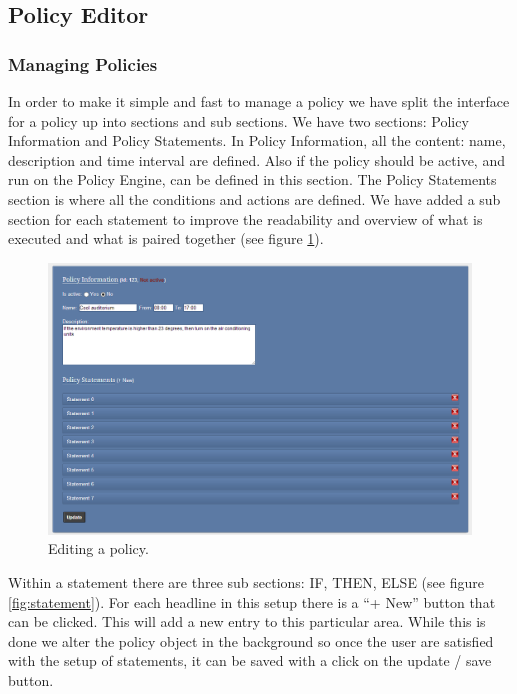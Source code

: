 \subsection{Policy Editor}

\subsubsection{Managing Policies}
In order to make it simple and fast to manage a policy we have split the interface for a policy up into sections and sub sections. We have two sections: Policy Information and Policy Statements. In Policy Information, all the content: name, description and time interval are defined. Also if the policy should be active, and run on the Policy Engine, can be defined in this section. The Policy Statements section is where all the conditions and actions are defined. We have added a sub section for each statement to improve the readability and overview of what is executed and what is paired together (see figure \ref{fig:policy}).  

\begin{figure}[ht]
\centering
\includegraphics[width=\columnwidth]{policy.png}
\caption{Editing a policy.}
\label{fig:policy}
\end{figure}

Within a statement there are three sub sections: IF, THEN, ELSE (see figure \ref{fig:statement}). For each headline in this setup there is a "`+ New"' button that can be clicked. This will add a new entry to this particular area. While this is done we alter the policy object in the background so once the user are satisfied with the setup of statements, it can be saved with a click on the update / save button.

